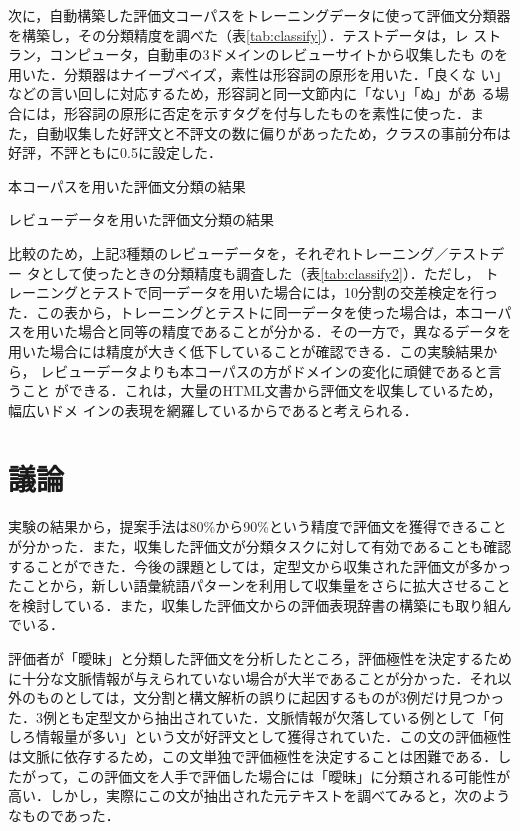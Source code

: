 \documentclass[japanese]{jnlp_1.4}
\begin{document}
次に，自動構築した評価文コーパスをトレーニングデータに使って評価文分類器
を構築し，その分類精度を調べた（表\ref{tab:classify}）．テストデータは，レ
ストラン，コンピュータ，自動車の3ドメインのレビューサイトから収集したも
のを用いた．分類器はナイーブベイズ，素性は形容詞の原形を用いた．「良くな
い」などの言い回しに対応するため，形容詞と同一文節内に「ない」「ぬ」があ
る場合には，形容詞の原形に否定を示すタグを付与したものを素性に使った．ま
た，自動収集した好評文と不評文の数に偏りがあったため，クラスの事前分布は
好評，不評ともに0.5に設定した．

\begin{table}[b]
  \caption{本コーパスを用いた評価文分類の結果}
  \label{tab:classify}

\end{table}
\begin{table}[b]
  \caption{レビューデータを用いた評価文分類の結果}
  \label{tab:classify2}

\end{table}


比較のため，上記3種類のレビューデータを，それぞれトレーニング／テストデー
タとして使ったときの分類精度も調査した（表\ref{tab:classify2}）．ただし，
トレーニングとテストで同一データを用いた場合には，10分割の交差検定を行っ
た．この表から，トレーニングとテストに同一データを使った場合は，本コーパ
スを用いた場合と同等の精度であることが分かる．その一方で，異なるデータを
用いた場合には精度が大きく低下していることが確認できる．この実験結果から，
レビューデータよりも本コーパスの方がドメインの変化に頑健であると言うこと
ができる．これは，大量のHTML文書から評価文を収集しているため，幅広いドメ
インの表現を網羅しているからであると考えられる．


\section{議論}

実験の結果から，提案手法は80\%から90\%という精度で評価文を獲得できること
が分かった．また，収集した評価文が分類タスクに対して有効であることも確認
することができた．今後の課題としては，定型文から収集された評価文が多かっ
たことから，新しい語彙統語パターンを利用して収集量をさらに拡大させること
を検討している．また，収集した評価文からの評価表現辞書の構築にも取り組ん
でいる．

評価者が「曖昧」と分類した評価文を分析したところ，評価極性を決定するため
に十分な文脈情報が与えられていない場合が大半であることが分かった．それ以
外のものとしては，文分割と構文解析の誤りに起因するものが3例だけ見つかっ
た．3例とも定型文から抽出されていた．文脈情報が欠落している例として「何
しろ情報量が多い」という文が好評文として獲得されていた．この文の評価極性
は文脈に依存するため，この文単独で評価極性を決定することは困難である．し
たがって，この評価文を人手で評価した場合には「曖昧」に分類される可能性が
高い．しかし，実際にこの文が抽出された元テキストを調べてみると，次のよう
なものであった．
\end{document}
